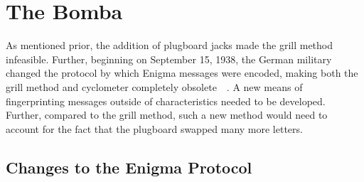\section{The Bomba}

As mentioned prior, the addition of plugboard jacks made the grill
method infeasible.
Further, beginning on September 15, 1938, the German military changed
the protocol by which Enigma messages were encoded, making both the grill
method and cyclometer completely obsolete~\cite{rijmenants2010enigma}~\cite[pp.~237, 244]{KozaczukEnigma1984}. A new means of
fingerprinting messages
outside of characteristics needed to be developed. Further, compared
to the grill method, such a new method would need to account for the
fact that the plugboard swapped many more letters.

\subsection{Changes to the Enigma Protocol}

